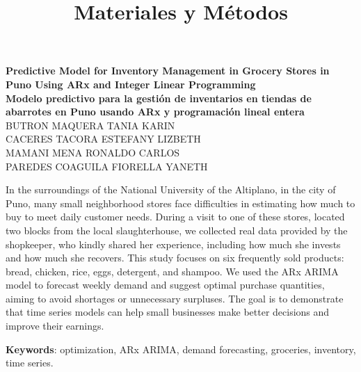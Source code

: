 \documentclass[12pt]{article}
\title{Materiales y Métodos}
\author{}
\date{}
\begin{document}
\begin{center}

    \LARGE \textbf{Predictive Model for Inventory Management in Grocery Stores in Puno Using ARx and Integer Linear Programming}\\[0.5cm]
    
    \Large \textbf{Modelo predictivo para la gestión de inventarios en tiendas de abarrotes en Puno usando ARx y programación lineal entera}\\[0.5cm]
    
    \normalsize BUTRON MAQUERA TANIA KARIN\\
    CACERES TACORA ESTEFANY LIZBETH\\
    MAMANI MENA RONALDO CARLOS\\
    PAREDES COAGUILA FIORELLA YANETH\\
\end{center}

\vspace{0.5cm}

\begin{tcolorbox}[colback=gray!10, colframe=black, title=\normalsize Abstract]
\justifying
In the surroundings of the National University of the Altiplano, in the city of Puno, many small neighborhood stores face difficulties in estimating how much to buy to meet daily customer needs. During a visit to one of these stores, located two blocks from the local slaughterhouse, we collected real data provided by the shopkeeper, who kindly shared her experience, including how much she invests and how much she recovers. This study focuses on six frequently sold products: bread, chicken, rice, eggs, detergent, and shampoo. We used the ARx ARIMA model to forecast weekly demand and suggest optimal purchase quantities, aiming to avoid shortages or unnecessary surpluses. The goal is to demonstrate that time series models can help small businesses make better decisions and improve their earnings.

\textbf{Keywords}: optimization, ARx ARIMA, demand forecasting, groceries, inventory, time series.
\end{tcolorbox}

\vspace{0.5cm}
\end{document}
